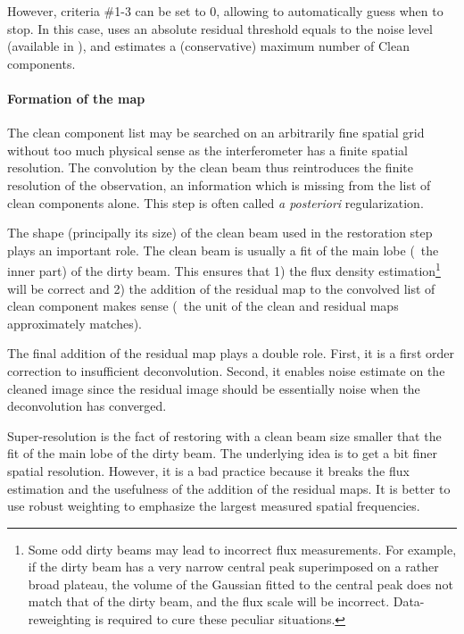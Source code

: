 However, criteria \#1-3 can be set to 0, allowing \imager{} to 
automatically guess when to stop. In this case, \imager{} uses
an absolute residual threshold equals to the noise level (available
in ), and estimates a (conservative) maximum
number of Clean components. 

\paragraph{Formation of the \clean{} map}

The clean component list may be searched on an arbitrarily fine spatial 
grid without too much physical sense as the interferometer has a finite 
spatial resolution.  The convolution by the clean beam thus 
reintroduces the finite resolution of the observation, an information 
which is missing from the list of clean components alone. This step is 
often called \emph{a posteriori} regularization.

The shape (principally its size) of the clean beam used in the 
restoration step plays an important role. The clean beam is usually a 
fit of the main lobe (\ie\ the inner part) of the dirty beam. This 
ensures that 1) the flux density estimation\footnote{Some odd dirty 
beams may lead to incorrect flux measurements. For example, if the 
dirty beam has a very narrow central peak superimposed on a rather 
broad plateau, the volume of the Gaussian fitted to the central peak 
does not match that of the dirty beam, and the flux scale will be 
incorrect. Data-reweighting is required to cure these peculiar 
situations.} will be correct and 2) the addition of the residual map to 
the convolved list of clean component makes sense (\ie\ the unit of the 
clean and residual maps approximately matches). 

The final addition of the residual map plays a double role. First, it 
is a first order correction to insufficient deconvolution. Second, it 
enables noise estimate on the cleaned image since the residual image 
should be essentially noise when the deconvolution has converged.

Super-resolution is the fact of restoring with a clean beam size 
smaller that the fit of the main lobe of the dirty beam. The underlying 
idea is to get a bit finer spatial resolution. However, it is a bad 
practice because it breaks the flux estimation and the usefulness of 
the addition of the residual maps. It is better to use robust weighting 
to emphasize the largest measured spatial frequencies.


